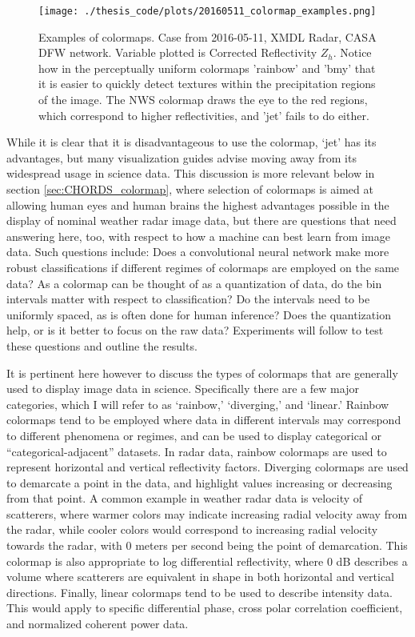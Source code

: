 \begin{figure}[h]
	\centering
	\texttt{[image: ./thesis\_code/plots/20160511\_colormap\_examples.png]}
	\caption{Examples of colormaps. Case from 2016-05-11, XMDL Radar, CASA DFW network. Variable plotted is Corrected Reflectivity $Z_h$. Notice how in the perceptually uniform colormaps 'rainbow' and 'bmy' that it is easier to quickly detect textures within the precipitation regions of the image. The NWS colormap draws the eye to the red regions, which correspond to higher reflectivities, and 'jet' fails to do either.}
	\label{fig:background_colormap_examples}
\end{figure}

While it is clear that it is disadvantageous to use the colormap, ‘jet’ has its advantages, but many visualization guides advise moving away from its widespread usage in science data. 
This discussion is more relevant below in section \ref{sec:CHORDS_colormap}, where selection of colormaps is aimed at allowing human eyes and human brains the highest advantages possible in the display of nominal weather radar image data, but there are questions that need answering here, too, with respect to how a machine can best learn from image data. 
Such questions include: Does a convolutional neural network make more robust classifications if different regimes of colormaps are employed on the same data? 
As a colormap can be thought of as a quantization of data, do the bin intervals matter with respect to classification? 
Do the intervals need to be uniformly spaced, as is often done for human inference? 
Does the quantization help, or is it better to focus on the raw data? 
Experiments will follow to test these questions and outline the results.

It is pertinent here however to discuss the types of colormaps that are generally used to display image data in science. 
Specifically there are a few major categories, which I will refer to as ‘rainbow,’ ‘diverging,’ and ‘linear.’
Rainbow colormaps tend to be employed where data in different intervals may correspond to different phenomena or regimes, and can be used to display categorical or “categorical-adjacent” datasets. 
In radar data, rainbow colormaps are used to represent horizontal and vertical reflectivity factors. 
Diverging colormaps are used to demarcate a point in the data, and highlight values increasing or decreasing from that point. 
A common example in weather radar data is velocity of scatterers, where warmer colors may indicate increasing radial velocity away from the radar, while cooler colors would correspond to increasing radial velocity towards the radar, with 0 meters per second being the point of demarcation. 
This colormap is also appropriate to log differential reflectivity, where 0 dB describes a volume where scatterers are equivalent in shape in both horizontal and vertical directions. Finally, linear colormaps tend to be used to describe intensity data. 
This would apply to specific differential phase, cross polar correlation coefficient, and normalized coherent power data.

